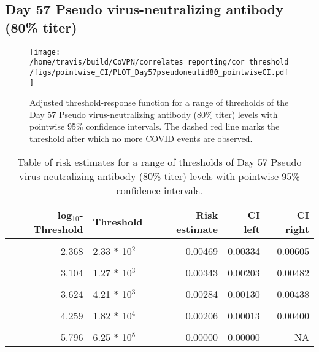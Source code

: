 \documentclass[]{book}
\theoremstyle{definition}
\theoremstyle{definition}
\theoremstyle{definition}
\newcommand{\1}{\mathbbm{1}}
\begin{document}
\clearpage

\clearpage

\clearpage

\hypertarget{day-57-pseudo-virus-neutralizing-antibody-80-titer}{%
\subsection{Day 57 Pseudo virus-neutralizing antibody (80\% titer)}\label{day-57-pseudo-virus-neutralizing-antibody-80-titer}}

\begin{figure}[H]
\centering
\texttt{[image: /home/travis/build/CoVPN/correlates\_reporting/cor\_threshold/figs/pointwise\_CI/PLOT\_Day57pseudoneutid80\_pointwiseCI.pdf]}
\caption{Adjusted threshold-response function for a range of thresholds of the
  Day 57 Pseudo virus-neutralizing antibody (80\% titer) levels with pointwise 95\% confidence intervals. The dashed red line marks the threshold after which no more COVID events are observed. }
\end{figure}
\begin{table}[!h]

\caption{\label{tab:unnamed-chunk-353}Table of risk estimates for a range of thresholds of Day 57 Pseudo virus-neutralizing antibody (80\% titer) levels with pointwise 95\% confidence intervals.}
\centering
\begin{tabular}[t]{rlrrr}
\toprule
log$_{10}$-Threshold & Threshold & Risk estimate & CI left & CI right\\
\midrule
\cellcolor{gray!6}{1.289} & \cellcolor{gray!6}{1.95 * 10$^1$} & \cellcolor{gray!6}{0.00514} & \cellcolor{gray!6}{0.00381} & \cellcolor{gray!6}{0.00647}\\
2.368 & 2.33 * 10$^2$ & 0.00469 & 0.00334 & 0.00605\\
\cellcolor{gray!6}{2.755} & \cellcolor{gray!6}{5.69 * 10$^2$} & \cellcolor{gray!6}{0.00428} & \cellcolor{gray!6}{0.00290} & \cellcolor{gray!6}{0.00565}\\
3.104 & 1.27 * 10$^3$ & 0.00343 & 0.00203 & 0.00482\\
\cellcolor{gray!6}{3.373} & \cellcolor{gray!6}{2.36 * 10$^3$} & \cellcolor{gray!6}{0.00310} & \cellcolor{gray!6}{0.00169} & \cellcolor{gray!6}{0.00452}\\
3.624 & 4.21 * 10$^3$ & 0.00284 & 0.00130 & 0.00438\\
\cellcolor{gray!6}{3.909} & \cellcolor{gray!6}{8.11 * 10$^3$} & \cellcolor{gray!6}{0.00244} & \cellcolor{gray!6}{0.00085} & \cellcolor{gray!6}{0.00404}\\
4.259 & 1.82 * 10$^4$ & 0.00206 & 0.00013 & 0.00400\\
\cellcolor{gray!6}{4.676} & \cellcolor{gray!6}{4.74 * 10$^4$} & \cellcolor{gray!6}{0.00256} & \cellcolor{gray!6}{0.00000} & \cellcolor{gray!6}{0.00567}\\
5.796 & 6.25 * 10$^5$ & 0.00000 & 0.00000 & NA\\
\bottomrule
\end{tabular}
\end{table}
\end{document}
